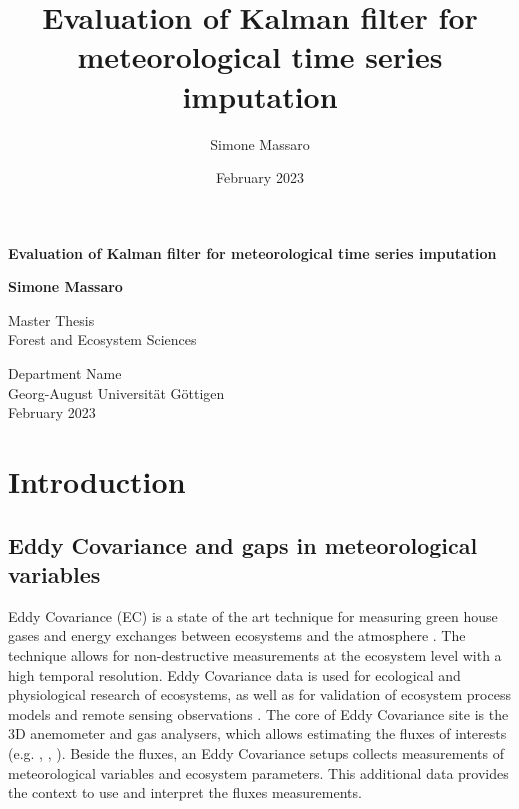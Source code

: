 \documentclass{article}
\title{Evaluation of Kalman filter for meteorological time series imputation}
\author{Simone Massaro}
\date{February 2023}
\let\Oldsection\section
\renewcommand{\section}{\FloatBarrier\Oldsection}
\let\Oldsubsection\subsection
\renewcommand{\subsection}{\FloatBarrier\Oldsubsection}
\begin{document}
\begin{titlepage}
    \begin{center}
        \vspace*{1cm}
            
        \Huge
        \textbf{Evaluation of Kalman filter for meteorological time series imputation}
            
        \vspace{0.5cm}
        \LARGE
            
        \vspace{1.5cm}
            
        \textbf{Simone Massaro}
            
        \vfill
            
        Master Thesis\\
        Forest and Ecosystem Sciences
            
        \vspace{0.3cm}
            
        \Large
        Department Name\\
        Georg-August Universität Göttigen \\
        February 2023
            
    \end{center}
\end{titlepage}
\clearpage
\tableofcontents
\clearpage
\section{Introduction}

\subsection{Eddy Covariance and gaps in meteorological variables}

Eddy Covariance (EC) is a state of the art technique for measuring green house gases and energy exchanges between ecosystems and the atmosphere \cite{aubinet_eddy_2012-1}.  The technique allows for non-destructive measurements at the ecosystem level with a high temporal resolution. Eddy Covariance data is used for ecological and physiological research of ecosystems, as well as for validation of ecosystem process models and remote sensing observations \cite{papale_ideas_2020}.
The core of Eddy Covariance site is the 3D anemometer and gas analysers, which allows estimating the fluxes of interests (e.g. , , ). Beside the fluxes, an Eddy Covariance setups collects measurements of meteorological variables and ecosystem parameters. This additional data provides the context to use and interpret the fluxes measurements.
\end{document}
